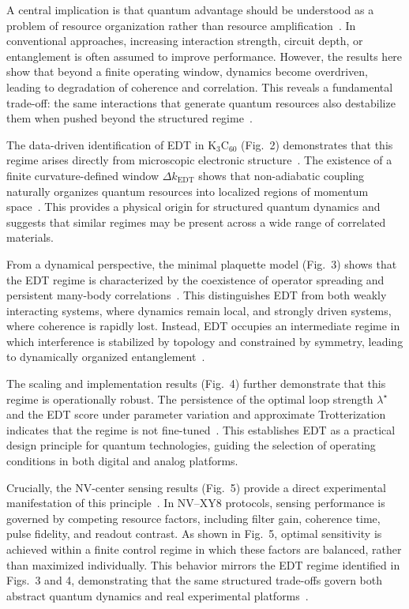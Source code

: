 \documentclass[twocolumn,10pt]{article}
\begin{document}
A central implication is that quantum advantage should be understood as a problem of resource organization rather than resource amplification~\cite{Preskill2018}. In conventional approaches, increasing interaction strength, circuit depth, or entanglement is often assumed to improve performance. However, the results here show that beyond a finite operating window, dynamics become overdriven, leading to degradation of coherence and correlation. This reveals a fundamental trade-off: the same interactions that generate quantum resources also destabilize them when pushed beyond the structured regime~\cite{Altman2015,Swingle2018}.

The data-driven identification of EDT in K$_3$C$_{60}$ (Fig.~2) demonstrates that this regime arises directly from microscopic electronic structure~\cite{Gunnarsson1997,Capone2009}. The existence of a finite curvature-defined window $\Delta k_{\mathrm{EDT}}$ shows that non-adiabatic coupling naturally organizes quantum resources into localized regions of momentum space~\cite{Mead1979,Yarkony1996}. This provides a physical origin for structured quantum dynamics and suggests that similar regimes may be present across a wide range of correlated materials.

From a dynamical perspective, the minimal plaquette model (Fig.~3) shows that the EDT regime is characterized by the coexistence of operator spreading and persistent many-body correlations~\cite{Choi2016,KimHuse2013}. This distinguishes EDT from both weakly interacting systems, where dynamics remain local, and strongly driven systems, where coherence is rapidly lost. Instead, EDT occupies an intermediate regime in which interference is stabilized by topology and constrained by symmetry, leading to dynamically organized entanglement~\cite{Swingle2018}.

The scaling and implementation results (Fig.~4) further demonstrate that this regime is operationally robust. The persistence of the optimal loop strength $\lambda^\star$ and the EDT score under parameter variation and approximate Trotterization indicates that the regime is not fine-tuned~\cite{Lloyd1996,Childs2019}. This establishes EDT as a practical design principle for quantum technologies, guiding the selection of operating conditions in both digital and analog platforms.

Crucially, the NV-center sensing results (Fig.~5) provide a direct experimental manifestation of this principle~\cite{Degen2017,Barry2020}. In NV--XY8 protocols, sensing performance is governed by competing resource factors, including filter gain, coherence time, pulse fidelity, and readout contrast. As shown in Fig.~5, optimal sensitivity is achieved within a finite control regime in which these factors are balanced, rather than maximized individually. This behavior mirrors the EDT regime identified in Figs.~3 and 4, demonstrating that the same structured trade-offs govern both abstract quantum dynamics and real experimental platforms~\cite{Casola2018}.
\end{document}
